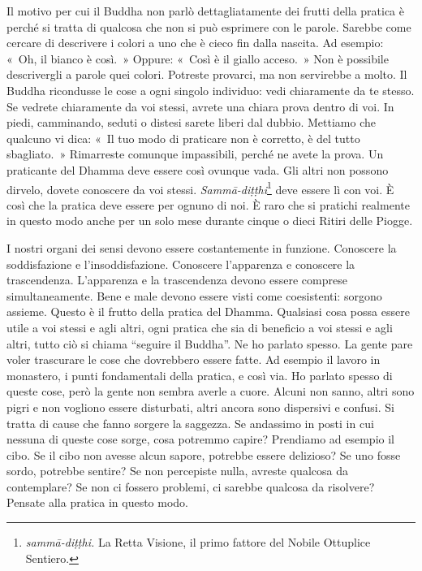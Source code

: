 Il motivo per cui il Buddha non parlò dettagliatamente dei frutti della
pratica è perché si tratta di qualcosa che non si può esprimere con le
parole. Sarebbe come cercare di descrivere i colori a uno che è cieco
fin dalla nascita. Ad esempio: «~Oh, il bianco è così.~» Oppure: «~Così
è il giallo acceso.~» Non è possibile descrivergli a parole quei colori.
Potreste provarci, ma non servirebbe a molto. Il Buddha ricondusse le
cose a ogni singolo individuo: vedi chiaramente da te stesso. Se vedrete
chiaramente da voi stessi, avrete una chiara prova dentro di voi. In
piedi, camminando, seduti o distesi sarete liberi dal dubbio. Mettiamo
che qualcuno vi dica: «~Il tuo modo di praticare non è corretto, è del
tutto sbagliato.~» Rimarreste comunque impassibili, perché ne avete la
prova. Un praticante del Dhamma deve essere così ovunque vada. Gli altri
non possono dirvelo, dovete conoscere da voi stessi.
\emph{Sammā-diṭṭhi}\footnote{\emph{sammā-diṭṭhi.} La Retta Visione, il
  primo fattore del Nobile Ottuplice Sentiero.} deve essere lì con voi.
È così che la pratica deve essere per ognuno di noi. È raro che si
pratichi realmente in questo modo anche per un solo mese durante cinque
o dieci Ritiri delle Piogge.

I nostri organi dei sensi devono essere costantemente in funzione.
Conoscere la soddisfazione e l'insoddisfazione. Conoscere l'apparenza e
conoscere la trascendenza. L'apparenza e la trascendenza devono essere
comprese simultaneamente. Bene e male devono essere visti come
coesistenti: sorgono assieme. Questo è il frutto della pratica del
Dhamma. Qualsiasi cosa possa essere utile a voi stessi e agli altri,
ogni pratica che sia di beneficio a voi stessi e agli altri, tutto ciò
si chiama ``seguire il Buddha''. Ne ho parlato spesso. La gente pare
voler trascurare le cose che dovrebbero essere fatte. Ad esempio il
lavoro in monastero, i punti fondamentali della pratica, e così via. Ho
parlato spesso di queste cose, però la gente non sembra averle a cuore.
Alcuni non sanno, altri sono pigri e non vogliono essere disturbati,
altri ancora sono dispersivi e confusi. Si tratta di cause che fanno
sorgere la saggezza. Se andassimo in posti in cui nessuna di queste cose
sorge, cosa potremmo capire? Prendiamo ad esempio il cibo. Se il cibo
non avesse alcun sapore, potrebbe essere delizioso? Se uno fosse sordo,
potrebbe sentire? Se non percepiste nulla, avreste qualcosa da
contemplare? Se non ci fossero problemi, ci sarebbe qualcosa da
risolvere? Pensate alla pratica in questo modo.

